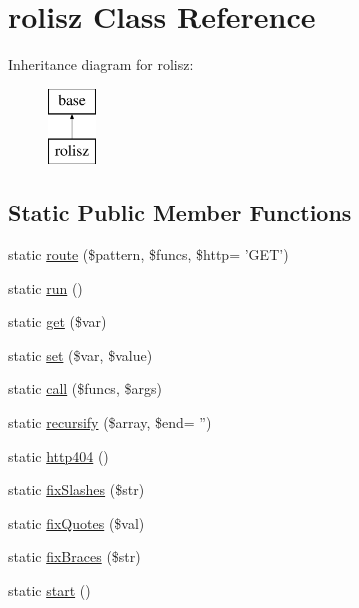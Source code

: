 \hypertarget{classrolisz}{
\section{rolisz Class Reference}
\label{classrolisz}
}
Inheritance diagram for rolisz:\begin{figure}[H]
\begin{center}
\leavevmode
\includegraphics[height=2.000000cm]{classrolisz}
\end{center}
\end{figure}
\subsection*{Static Public Member Functions}
\begin{DoxyCompactItemize}
\item 
static \hyperlink{classrolisz_ae9dbb7550b587e4e19bca121029e088b}{route} (\$pattern, \$funcs, \$http= 'GET')
\item 
static \hyperlink{classrolisz_ad3a572002fd350672b531756f7306e8f}{run} ()
\item 
static \hyperlink{classrolisz_a0e8f3e2708d9f0c6ee7b54599f57ea34}{get} (\$var)
\item 
static \hyperlink{classrolisz_a1d7c8d5e3d237bc3217650f79ab35bd3}{set} (\$var, \$value)
\item 
static \hyperlink{classrolisz_af732c33c326c863efe6dd2cccb21a9a5}{call} (\$funcs, \$args)
\item 
static \hyperlink{classrolisz_ad1b6efe27562cb6620a179f5688417bb}{recursify} (\$array, \$end= '')
\item 
static \hyperlink{classrolisz_a6fdc4c9fc517c619d860c7e91d17b02d}{http404} ()
\item 
static \hyperlink{classrolisz_a13d0c0500b75a5bdd849a4a55ba8e2b1}{fixSlashes} (\$str)
\item 
static \hyperlink{classrolisz_a031dd360aea86d999059dbfd18687973}{fixQuotes} (\$val)
\item 
static \hyperlink{classrolisz_ab8e0e9e5ffd59108f38efefe79511c5b}{fixBraces} (\$str)
\item 
static \hyperlink{classrolisz_a146085d0f3a9d17bdcd7f3d4081d8c0d}{start} ()
\end{DoxyCompactItemize}


